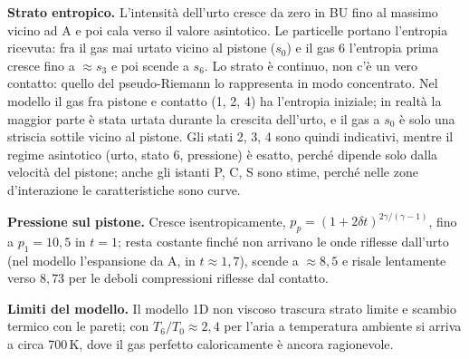 \textbf{Strato entropico.} L'intensità dell'urto cresce da zero in BU fino al massimo vicino ad A e poi cala verso il
valore asintotico. Le particelle portano l'entropia ricevuta: fra il gas mai urtato vicino al pistone ($s_0$) e il gas
6 l'entropia prima cresce fino a $\approx s_3$ e poi scende a $s_6$. Lo strato è continuo, non c'è un vero contatto:
quello del pseudo-Riemann lo rappresenta in modo concentrato. Nel modello il gas fra pistone e contatto (1, 2, 4) ha
l'entropia iniziale; in realtà la maggior parte è stata urtata durante la crescita dell'urto, e il gas a $s_0$ è solo
una striscia sottile vicino al pistone. Gli stati 2, 3, 4 sono quindi indicativi, mentre il regime asintotico (urto,
stato 6, pressione) è esatto, perché dipende solo dalla velocità del pistone; anche gli istanti P, C, S sono stime,
perché nelle zone d'interazione le caratteristiche sono curve.

\textbf{Pressione sul pistone.} Cresce isentropicamente, $p_p=(1+2\delta t)^{2\gamma/(\gamma-1)}$, fino a
$p_1=10{,}5$ in $t=1$; resta costante finché non arrivano le onde riflesse dall'urto (nel modello l'espansione da A,
in $t\approx1{,}7$), scende a $\approx8{,}5$ e risale lentamente verso $8{,}73$ per le deboli compressioni riflesse
dal contatto.

\textbf{Limiti del modello.} Il modello 1D non viscoso trascura strato limite e scambio termico con le pareti; con
$T_6/T_0\approx2{,}4$ per l'aria a temperatura ambiente si arriva a circa 700\,K, dove il gas perfetto
caloricamente è ancora ragionevole.



